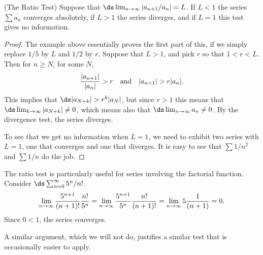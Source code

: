 \begin{theorem} (The Ratio Test)
Suppose that $\ds\lim_{n\to \infty} |a_{n+1}/a_n|=L$. If $L<1$
the series $\sum a_n$ converges absolutely, 
if $L>1$ the series diverges, and if
$L=1$ this test gives no information.
\begin{proof}
The example above essentially proves the first part of this, if we
simply replace $1/5$ by $L$ and $1/2$ by $r$. 
Suppose that $L>1$, and pick $r$ so that $1<r<L$.
Then for $n\ge N$, for some $N$,
$${|a_{n+1}|\over |a_n|} > r \hbox{\quad and\quad} |a_{n+1}| > r|a_n|.$$
This implies that $\ds |a_{N+k}|>r^k|a_N|$, but since $r>1$ this means
that $\ds\lim_{k\to\infty}|a_{N+k}|\not=0$, which means also that
$\ds\lim_{n\to\infty}a_n\not=0$. By the divergence test, the series
diverges. 

To see that we get no information when $L=1$, we need to exhibit two
series with $L=1$, one that converges and one that diverges. It is
easy to see that $\sum 1/n^2$ and $\sum 1/n$ do the job.
\end{proof}

\begin{example} The ratio test is particularly useful for series involving
the factorial function. Consider $\ds\sum_{n=0}^\infty  5^n/n!$. 
$$
  \lim_{n\to\infty} {5^{n+1}\over (n+1)!}{n!\over 5^n}=
  \lim_{n\to\infty} {5^{n+1}\over 5^n}{n!\over (n+1)!}=
  \lim_{n\to\infty} {5}{1\over (n+1)}=0.
$$
Since $0<1$, the series converges.
\end{example}

A similar argument, which we will not do, justifies a similar test
that is occasionally easier to apply. 

\end{theorem}
